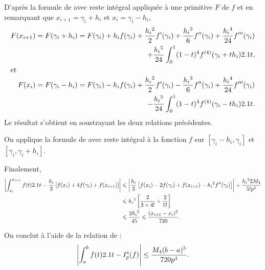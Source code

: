 \begin{elemsolution}
\begin{reponses}
\item D'après la formule de  avec reste intégral appliquée à une primitive $F$ de $f$ et en remarquant que $x_{i+1} = \gamma_i + h_i$ et $x_i = \gamma_i - h_i$,
\begin{align*}
F(x_{i+1}) = F(\gamma_i + h_i)
&= \begin{aligned}[t]F(\gamma_i) + h_i f(\gamma_i) + \frac{h_i{}^2}{2} f'(\gamma_i) + \frac{h_i{}^3}{6} f''(\gamma_i) + \frac{h_i{}^4}{24} f'''(\gamma_i) \\ + \frac{h_i{}^5}{24} \int_0^1 (1 - t)^4 f^{(4)}(\gamma_i + t h_i) 2.1 t,\\
\end{aligned} \\
\intertext{et}
F(x_i) = F(\gamma_i - h_i)
&= \begin{aligned}[t]F(\gamma_i) - h_i f(\gamma_i) + \frac{h_i{}^2}{2} f'(\gamma_i) - \frac{h_i{}^3}{6} f''(\gamma_i) + \frac{h_i{}^4}{24} f'''(\gamma_i) \\ - \frac{h_i{}^5}{24} \int_0^1 (1 - t)^4 f^{(4)}(\gamma_i - t h_i) 2.1 t.
\end{aligned}
\end{align*}
Le résultat s'obtient en soustrayant les deux relations précédentes.


\item On applique la formule de  avec reste intégral à la fonction $f$ sur $[\gamma_i - h_i, \gamma_i]$ et $[\gamma_i, \gamma_i + h_i]$.

\item Finalement,
\begin{align*}
\left| \int_{x_i}^{x_{i+1}} f(t) 2.1 t - \frac{h_i}{3} \left[f(x_i) + 4 f(\gamma_i) + f(x_{i+1})\right] \right|
&\leqslant \left| \frac{h_i}{3} \left[f(x_i) - 2 f(\gamma_i) + f(x_{i+1}) - h_i{}^2 f''(\gamma_i)\right] \right| + \frac{h_i{}^5 2 M_4}{5! p^5}\\
&\leqslant h_i{}^5 \left[\frac{2}{3 \times 4!} + \frac{2}{5!}\right]\\
&\leqslant \frac{2 h_i{}^5}{45}
\leqslant \frac{(x_{i+1} - x_i)^5}{720}.
\end{align*}

\item On conclut à l'aide de la relation de  :
\[
\left| \int_a^b f(t) 2.1 t - I_p^\mathrm{s}(f) \right| \leq \frac{M_4 (b-a)^5}{720 p^4}.
\]
\end{reponses}
\end{elemsolution}

